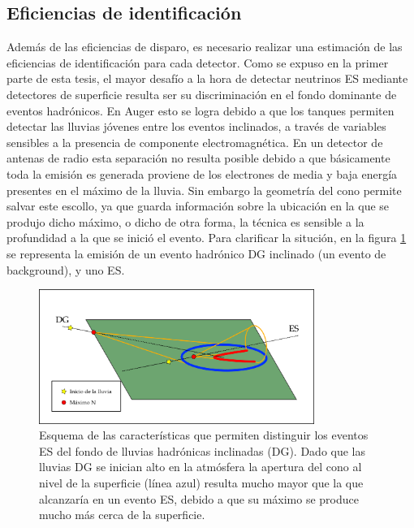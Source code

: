 	\clearpage
	\subsection{Eficiencias de identificaci\'on}
	\label{sc:identificacionRadio}
	
	Adem\'as de las eficiencias de disparo, es necesario realizar una estimaci\'on de las eficiencias de identificaci\'on para cada detector.
	Como se expuso en la primer parte de esta tesis, el mayor desaf\'io a la hora de detectar neutrinos ES mediante detectores de superficie resulta ser su discriminaci\'on en el fondo dominante de eventos hadr\'onicos.
	En Auger esto se logra debido a que los tanques \cher{} permiten detectar las lluvias j\'ovenes entre los eventos inclinados, a trav\'es de variables sensibles a la presencia de componente electromagn\'etica.
	En un detector de antenas de radio esta separaci\'on no resulta posible debido a que b\'asicamente toda la emisi\'on es generada proviene de los electrones de media y baja energ\'ia presentes en el m\'aximo de la lluvia.
	Sin embargo la geometr\'ia del cono \cher{} permite salvar este escollo, ya que guarda informaci\'on sobre la ubicaci\'on en la que se produjo dicho m\'aximo, o dicho de otra forma, la t\'ecnica es sensible a la profundidad a la que se inici\'o el evento.
	Para clarificar la situci\'on, en la figura \ref{fig:dg_vs_es_radio} se representa la emisi\'on de un evento hadr\'onico DG inclinado (un evento de background), y uno ES.
	\begin{figure}[ht!]
		\centering
		\includegraphics[width=0.8\textwidth]{./fig/simulacionRadio/idRadio.png}
		\caption{\label{fig:dg_vs_es_radio}
		Esquema de las caracter\'isticas que permiten distinguir los eventos ES del fondo de lluvias hadr\'onicas inclinadas (DG). Dado que las lluvias DG se inician alto en la atm\'osfera la apertura del cono \cher{} al nivel de la superficie (l\'inea azul) resulta mucho mayor que la que alcanzar\'ia en un evento ES, debido a que su m\'aximo se produce mucho m\'as cerca de la superficie.
		}
	\end{figure}
